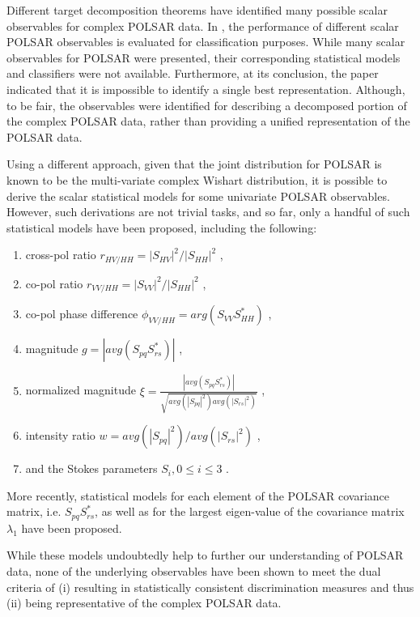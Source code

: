 \documentclass[journal]{IEEEtran}
\begin{document}
Different target decomposition theorems have identified many possible scalar observables for complex POLSAR data.
In \cite{Alberga_2008_IJRS_4129}, the performance of different scalar POLSAR observables is evaluated for classification purposes.
While many scalar observables for POLSAR were presented, their corresponding statistical models and classifiers were not available.
Furthermore, at its conclusion, the paper indicated that it is impossible to identify a single best representation.
Although, to be fair, the observables were identified for describing a decomposed portion of the complex POLSAR data,
  rather than providing a unified representation of the POLSAR data.

Using a different approach, given that the joint distribution for POLSAR is known to be the multi-variate complex Wishart distribution,
  it is possible to derive the scalar statistical models for some univariate POLSAR observables.
However, such derivations are not trivial tasks, and so far, only a handful of such statistical models have been proposed, including the following:
  \begin{enumerate}
  \item cross-pol ratio $r_{HV/HH} = |S_{HV}|^2/|S_{HH}|^2$ \cite{Joughin_1994_TGRS_562},
  \item co-pol ratio $r_{VV/HH} = |S_{VV}|^2/|S_{HH}|^2$ \cite{Joughin_1994_TGRS_562},
  \item co-pol phase difference $\phi_{VV/HH} = arg(S_{VV}S_{HH}^*) $ \cite{Joughin_1994_TGRS_562} \cite{Lee_1994_TGRS_1017},
  \item magnitude $g=|avg(S_{pq}S_{rs}^*)|$ \cite{Lee_1994_TGRS_1017},
  \item normalized magnitude $\xi = \frac{|avg(S_{pq}S_{rs}^*)|}{\sqrt{avg(|S_{pq}|^2) avg(|S_{rs}|^2)}}$ \cite{Lee_1994_TGRS_1017},
  \item intensity ratio $w = avg(|S_{pq}|^2)/avg(|S_{rs}|^2)$ \cite{Lee_1994_TGRS_1017},
  \item and the Stokes parameters $S_i,0 \leq i \leq 3$ \cite{Touzi_1996_TGRS_519}. 
  \end{enumerate}
More recently, statistical models for
  each element of the POLSAR covariance matrix, i.e. $S_{pq}S_{rs}^*$, \cite{Lopez-Martinez_2003_TGRS_2232}
  as well as for the largest eigen-value of the covariance matrix $\lambda_1$ \cite{Erten_2012_Sensors_2766} have been proposed.

While these models undoubtedly help to further our understanding of POLSAR data,
  none of the underlying observables have been shown to meet the dual criteria of
  (i) resulting in statistically consistent discrimination measures and thus 
  (ii) being representative of the complex POLSAR data.
\end{document}
